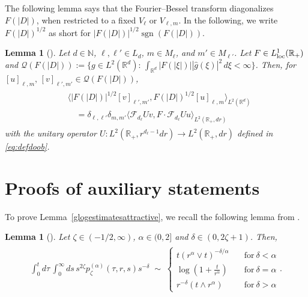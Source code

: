 \documentclass[12pt,reqno]{amsart}
\newtheorem{lemma}[theorem]{Lemma}
\theoremstyle{definition}
\theoremstyle{remark}
\numberwithin{equation}{section}
\newcommand{\1}{\mathbbm{1}}
\newcommand{\F}{\mathcal{F}}
\newcommand{\loc}{{\rm loc}}
\newcommand{\N}{\mathbb{N}}
\newcommand{\R}{\mathbb{R}}
\DeclareMathOperator{\sgn}{sgn}
\def\cq{\mathcal{Q}}
\begin{document}
The following lemma says that the Fourier--Bessel transform diagonalizes $F(|D|)$, when restricted to a fixed $V_{\ell}$ or $V_{\ell,m}$. In the following, we write $F(|D|)^{1/2}$ as short for $|F(|D|)|^{1/2}\sgn(F(|D|))$.

\begin{lemma}[{\cite[Lemma~4.1]{BogdanMerz2024}}]
  \label{fourierbessel}
  Let $d\in\N$, $\ell,\ell'\in L_d$, $m\in M_\ell$, and $m'\in M_{\ell'}$. Let $F\in L_\loc^1(\R_+)$ and $\cq(F(|D|)):=\{g\in L^2(\R^d):\, \int_{\R^d}|F(|\xi|)||\hat g(\xi)|^2\,d\xi<\infty\}$. Then, for $[u]_{\ell,m},\,[v]_{\ell',m'}\in \cq(F(|D|))$,
  \begin{align}
    \label{eq:fourierbessel1}
    \begin{split}
      & \langle |F(|D|)|^{1/2} [v]_{\ell',m'},F(|D|)^{1/2} [u]_{\ell,m}\rangle_{L^2(\R^d)} \\
      & \quad = \delta_{\ell,\ell'}\delta_{m,m'}\langle \F_{d_\ell} Uv,F \cdot \F_{d_\ell} Uu\rangle_{L^2(\R_+,dr)}
    \end{split}
  \end{align}
  with the unitary operator $U:L^2(\R_+,r^{d_\ell-1}dr)\to L^2(\R_+,dr)$ defined in \eqref{eq:defdoob}.
\end{lemma}


\section{Proofs of auxiliary statements}
\label{a:auxiliary}

To prove Lemma~\ref{glogestimatesattractive}, we recall the following lemma from \cite{Bogdanetal2024}.

\begin{lemma}[{\cite[Lemma~3.1]{Bogdanetal2024}}]
 \label{integralana1}
 Let $\zeta\in(-1/2,\infty)$, $\alpha\in(0,2]$ and $\delta \in (0,2\zeta+1)$. Then,
 \begin{align}
    \label{eq:hbetagammataurintegratedtransformed}
    \begin{split}
       \int_0^t d\tau\, \int_0^\infty ds\, s^{2\zeta} p_\zeta^{(\alpha)}(\tau,r,s) s^{-\delta} \; \sim \;
        \begin{cases}
          t (r^\alpha \vee t)^{-\delta/\alpha} & \quad \text{for}\ \delta<\alpha \\
          \log(1+\frac{t}{r^\alpha}) & \quad \text{for}\ \delta=\alpha \\
          r^{-\delta}  (t\wedge r^\alpha)  & \quad \text{for}\ \delta>\alpha
        \end{cases}.
    \end{split}
  \end{align}
\end{lemma}
\end{document}
